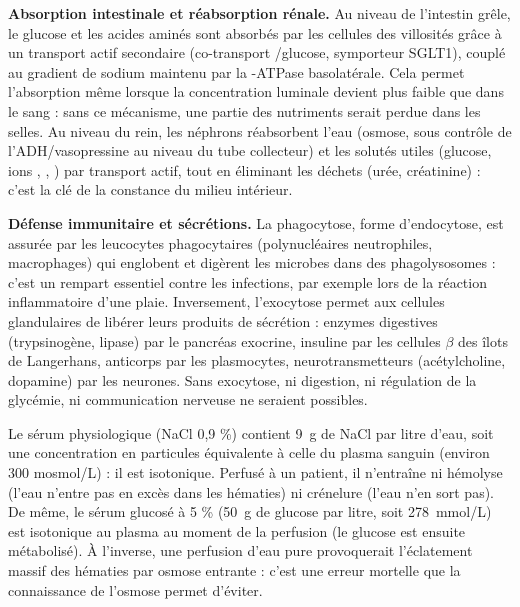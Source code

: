 \documentclass[11pt]{article}
\newcommand{\cle}[1]{{\popxbold\color{popdark}#1}}
\newcounter{popsec}
\newcounter{popsub}
\newcommand{\courssub}[1]{%
  \stepcounter{popsub}%
  \par\vspace{9pt}\noindent{\popxbold\fontsize{11.5}{13}\selectfont\color{popink}{\color{poporange}\thepopsec.\thepopsub}\hspace{6pt}#1}\par\nopagebreak\vspace{4pt}
}
\begin{document}
\textbf{Absorption intestinale et réabsorption rénale.} Au niveau de l'intestin grêle, le glucose et les acides aminés sont absorbés par les cellules des villosités grâce à un \cle{transport actif secondaire} (co-transport /glucose, symporteur SGLT1), couplé au gradient de sodium maintenu par la -ATPase basolatérale. Cela permet l'absorption même lorsque la concentration luminale devient plus faible que dans le sang : sans ce mécanisme, une partie des nutriments serait perdue dans les selles. Au niveau du rein, les néphrons \cle{réabsorbent} l'eau (osmose, sous contrôle de l'ADH/vasopressine au niveau du tube collecteur) et les solutés utiles (glucose, ions , , ) par transport actif, tout en éliminant les déchets (urée, créatinine) : c'est la clé de la constance du milieu intérieur.

\textbf{Défense immunitaire et sécrétions.} La \cle{phagocytose}, forme d'endocytose, est assurée par les leucocytes phagocytaires (polynucléaires neutrophiles, macrophages) qui englobent et digèrent les microbes dans des phagolysosomes : c'est un rempart essentiel contre les infections, par exemple lors de la réaction inflammatoire d'une plaie. Inversement, l'\cle{exocytose} permet aux cellules glandulaires de libérer leurs produits de sécrétion : enzymes digestives (trypsinogène, lipase) par le pancréas exocrine, \cle{insuline} par les cellules \cle{$\beta$ des îlots de Langerhans}, anticorps par les plasmocytes, neurotransmetteurs (acétylcholine, dopamine) par les neurones. Sans exocytose, ni digestion, ni régulation de la glycémie, ni communication nerveuse ne seraient possibles.

\courssub{Applications médicales}

\begin{exemplebox}
Le \cle{sérum physiologique} (NaCl 0,9 \%) contient \SI{9}{g} de NaCl par litre d'eau, soit une concentration en particules équivalente à celle du plasma sanguin (environ 300 mosmol/L) : il est \cle{isotonique}. Perfusé à un patient, il n'entraîne ni hémolyse (l'eau n'entre pas en excès dans les hématies) ni crénelure (l'eau n'en sort pas). De même, le \cle{sérum glucosé à 5 \%} (\SI{50}{g} de glucose par litre, soit \SI{278}{mmol/L}) est isotonique au plasma au moment de la perfusion (le glucose est ensuite métabolisé). À l'inverse, une perfusion d'eau pure provoquerait l'éclatement massif des hématies par osmose entrante : c'est une erreur mortelle que la connaissance de l'osmose permet d'éviter.
\end{exemplebox}
\end{document}
